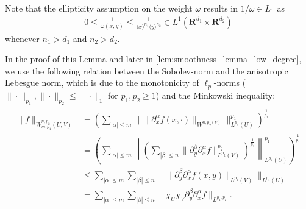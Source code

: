\documentclass[a4paper]{article}
\newcommand{\rr}[1]{\mathbf{R}^{#1}}
\newcommand{\rrI}{\rr{d_1}}
\newcommand{\rrII}{\rr{d_2}}
\newcommand{\rrIxII}{\rrI\times\rrII}
\newcommand{\eabs}[1]{\langle #1\rangle}     %
\newcommand{\norm}[2]{\|#1\|_{#2}}
\newcommand{\normbig}[2]{\left\|#1\right\|_{#2}}
\newcommand{\chF}[1]{\chi_{#1}}
\numberwithin{equation}{section}
\theoremstyle{remark}
\begin{document}
Note that the ellipticity assumption on the weight $\omega$ results in $1/\omega\in L_1$ as
\begin{align*}
0\leq\frac 1{\omega(x,y)} \leq \frac 1{\eabs{x}^{n_1}\eabs{y}^{n_2}}
\in L^{1}(\rrIxII)
\end{align*}
whenever $n_1>d_1$ and $n_2>d_2$.


In the proof of this Lemma and later
in \cref{lem:smoothness_lemma_low_degree},
we use the following relation between the Sobolev-norm
and the anisotropic Lebesgue norm, which is due to the monotonicity
of \(\ell_p\)-norms (\(\|\cdot\|_{p_1},\|\cdot\|_{p_2}\leq\|\cdot\|_1\)
for \(p_1,p_2\geq 1\)) and the Minkowski inequality:
\begin{align}
    \label{eq:sobolev_to_lpq}
    \begin{split}
        \norm{f}{W_{m,p_1}^{n, p_2}(U, V)}
        &=\left(\sum_{|\alpha|\leq m}\norm{\norm{\partial_x^\alpha f(x,\cdot)}{W^{n,p_2(V)}}}{L^{p_1}(U)}^{p_1}\right)^{\frac{1}{p_1}}\\
        &=\left(\sum_{|\alpha|\leq m}\normbig{\left(\sum_{|\beta|\leq n}\norm{\partial_y^\beta\partial_x^\alpha f}{L^{p_2}(V)}^{p_2}\right)^{\frac{1}{p_2}}}{L^{p_1}(U)}^{p_1}\right)^{\frac{1}{p_1}}\\
        &\leq\sum_{|\alpha|\leq m}\sum_{|\beta|\leq n}\norm{\norm{\partial_y^\beta\partial_x^\alpha f(x,y)}{L^{p_2}(V)}}{L^{p_1}(U)}\\
        &=\sum_{|\alpha|\leq m}\sum_{|\beta|\leq n}\norm{\chF{U}\chF{V}\partial_y^\beta\partial_x^\alpha f}{L^{p_1,p_2}}.
    \end{split}
\end{align}
\end{document}
